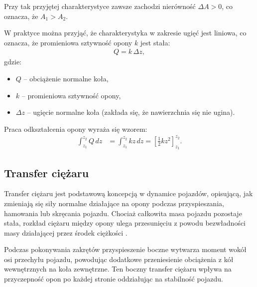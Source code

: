 \documentclass{article}
\begin{document}
	Przy tak przyjętej charakterystyce zawsze zachodzi nierówność $\Delta A > 0$, co oznacza, że $A_1 > A_2$.  
	
	W praktyce można przyjąć, że charakterystyka w zakresie ugięć jest liniowa, co oznacza, że promieniowa sztywność opony $k$ jest stała:
	\begin{align}
		Q = k \, \Delta z,
	\end{align}
	gdzie:
	\begin{itemize}
		\item $Q$ – obciążenie normalne koła,
		\item $k$ – promieniowa sztywność opony,
		\item $\Delta z$ – ugięcie normalne koła (zakłada się, że nawierzchnia się nie ugina).
	\end{itemize}
	
	Praca odkształcenia opony wyraża się wzorem:
	\begin{align}
		\int_{z_1}^{z_2} Q \, dz &= \int_{z_1}^{z_2} k z \, dz = \left[ \frac{1}{2} k z^2 \right]_{z_1}^{z_2}.
	\end{align}

	\subsection{Transfer ciężaru}
	Transfer ciężaru jest podstawową koncepcją w dynamice pojazdów, opisującą, jak zmieniają się siły normalne działające na opony podczas przyspieszania, hamowania lub skręcania pojazdu. Chociaż całkowita masa pojazdu pozostaje stała, rozkład ciężaru między opony ulega przesunięciu z powodu bezwładności masy działającej przez środek ciężkości \cite{Beckman}.
	
	Podczas pokonywania zakrętów przyspieszenie boczne wytwarza moment wokół osi przechyłu pojazdu, powodując dodatkowe przeniesienie obciążenia z kół wewnętrznych na koła zewnętrzne. Ten boczny transfer ciężaru wpływa na przyczepność opon po każdej stronie oddziałując na stabilność pojazdu.
	
\end{document}
